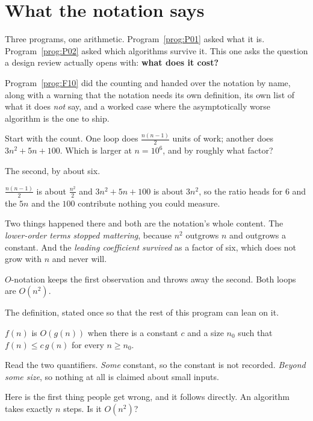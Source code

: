 \section{What the notation says}
\label{sec:P03-says}

\begin{fr}
Three programs, one arithmetic. Program~\ref{prog:P01} asked what it is.
Program~\ref{prog:P02} asked which algorithms survive it. This one asks the
question a design review actually opens with: \textbf{what does it cost?}

Program~\ref{prog:F10} did the counting and handed over the notation by name,
along with a warning that the notation needs its own definition, its own list
of what it does \emph{not} say, and a worked case where the asymptotically
worse algorithm is the one to ship.

Start with the count. One loop does $\frac{n(n-1)}{2}$ units of work; another
does $3n^{2} + 5n + 100$. Which is larger at $n = 10^{6}$, and by roughly what
factor?
\nextframe
\end{fr}

\begin{fr}
\begin{ansblock}
The second, by about six.
\end{ansblock}

$\frac{n(n-1)}{2}$ is about $\frac{n^{2}}{2}$ and $3n^{2} + 5n + 100$ is about
$3n^{2}$, so the ratio heads for $6$ and the $5n$ and the $100$ contribute
nothing you could measure.

Two things happened there and both are the notation's whole content. The
\emph{lower-order terms stopped mattering}, because $n^{2}$ outgrows $n$ and
outgrows a constant. And the \emph{leading coefficient survived} as a factor of
six, which does not grow with $n$ and never will.

$O$-notation keeps the first observation and throws away the second. Both loops
are $O(n^{2})$.
\end{fr}

\begin{fr}
The definition, stated once so that the rest of this program can lean on it.

\medskip
\noindent
$f(n)$ is $O(g(n))$ when there is a constant $c$ and a size $n_0$ such that
$f(n) \le c\,g(n)$ for every $n \ge n_0$.

\medskip
\noindent
Read the two quantifiers. \emph{Some} constant, so the constant is not
recorded. \emph{Beyond some size}, so nothing at all is claimed about small
inputs.

Here is the first thing people get wrong, and it follows directly. An algorithm
takes exactly $n$ steps. Is it $O(n^{2})$?
\nextframe
\end{fr}

